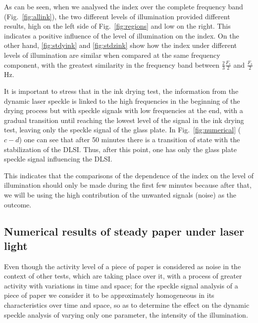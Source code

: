 \documentclass[review]{elsarticle}
\begin{document}
As can be seen, when we analysed the index over the complete frequency band (Fig.~\ref{fig:allink}),
the two different levels of illumination provided different results, high on the left 
side of Fig.~\ref{fig:regions} and low on the right. This 
indicates a positive influence of the level of illumination on the index.
On the other hand, %
\ref{fig:stdyink} and \ref{fig:stdzink}
show how the index under different levels of illumination are similar when compared at the same frequency component,
with the greatest similarity in the frequency band between $\frac{2}{3}\frac{F_s}{2}$ and $\frac{F_s}{2}$ Hz.

It is important to stress that in the ink drying test, the information 
from the dynamic laser speckle is linked to the high frequencies in the beginning of 
the drying process but with speckle signals with low frequencies at the end, with a gradual transition
until reaching the lowest 
level of the signal in the ink drying test, leaving
only the speckle signal of the glass plate.
In Fig.~\ref{fig:numerical} ($c-d$) one can see that after 50 minutes there is a 
transition of state with the stabilization of the DLSI. Thus, after this point, 
one has only the glass plate speckle signal influencing the DLSI.

This indicates that the comparisons of the dependence of the index on the level of illumination
should only be made during the first few minutes because after that, we will be using the high contribution of 
the unwanted signals (noise) as the outcome.

\subsection{Numerical results of steady paper under laser light} 
\label{subsec:numericalpaper}


Even though the activity level of a piece of paper 
is considered as noise in the context of other tests, which are taking place over it, 
with
a process of greater activity with variations in time and space;
for the speckle signal analysis of a piece of paper 
we consider it to be approximately homogeneous in its characteristics over time and space,
so as to determine the effect on the dynamic speckle analysis of varying only one parameter, the intensity of the illumination. 
\end{document}

